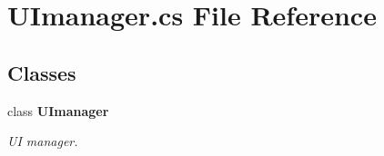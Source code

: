 \section{U\+Imanager.\+cs File Reference}
\label{_u_imanager_8cs}
\subsection*{Classes}
\begin{DoxyCompactItemize}
\item 
class {\bf U\+Imanager}
\begin{DoxyCompactList}\small\item\em UI manager. \end{DoxyCompactList}\end{DoxyCompactItemize}

